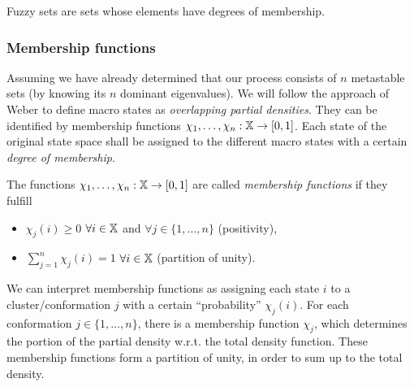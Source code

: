 
Fuzzy sets are sets whose elements have degrees of membership.


\subsubsection*{Membership functions}

Assuming we have already determined that our process consists of $n$ metastable sets (by knowing its $n$ dominant eigenvalues).
We will follow the approach of Weber\cite{weber2006meshless} to define macro states as \textit{overlapping partial densities}. They can be identified by membership functions $\chi_1,\dots,\chi_n : \mathbb{X} \rightarrow [0,1]$. Each state of the original state space shall be assigned to the different macro states with a certain \textit{degree of membership}.

\begin{defi}
The functions $\chi_1,\dots,\chi_n : \mathbb{X} \rightarrow [0,1]$ are called \textit{membership functions} if they fulfill
\begin{itemize}
\item $\chi_j(i) \geq 0$ $\forall i \in \mathbb{X}$ and $\forall j \in \{1,\dots,n\}$ (positivity),
\item $\sum_{j = 1}^n \chi_j(i) = 1$ $\forall i \in \mathbb{X}$ (partition of unity).
\end{itemize}

\end{defi}

We can interpret membership functions as assigning each state $i$ to a cluster/conformation $j$ with a certain ``probability'' $\chi_j(i)$.
For each conformation $j \in \{ 1 , \dots, n \}$, there is a membership function $\chi_j$, which determines the portion of the partial density w.r.t. the total density function. 
These membership functions form a partition of unity, in order to sum up to the total density.
\\

